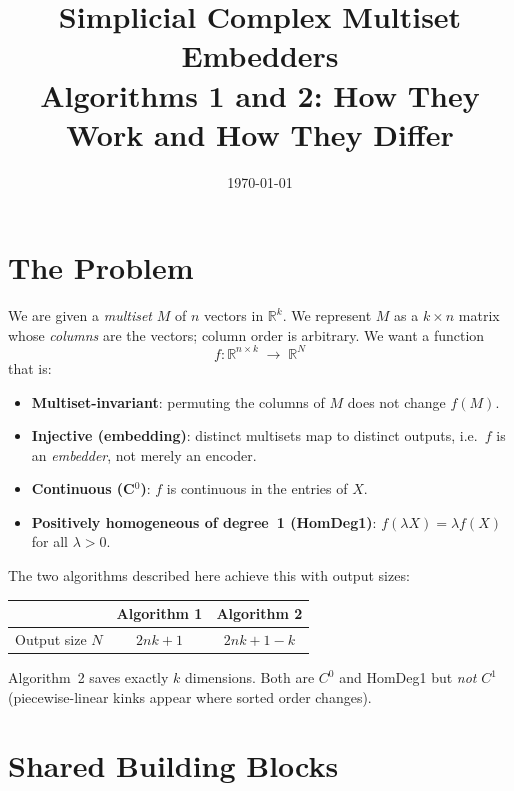 \documentclass[11pt,a4paper]{article}
\title{\textbf{Simplicial Complex Multiset Embedders}\\[0.4em]
       \large Algorithms 1 and 2: How They Work and How They Differ}
\date{\today}
\newcommand{\R}{\mathbb{R}}
\begin{document}
\maketitle
\tableofcontents
\vspace{1em}

\section{The Problem}

We are given a \emph{multiset} $M$ of $n$ vectors in $\R^k$.
We represent $M$ as a $k{\times}n$ matrix whose \emph{columns} are the vectors;
column order is arbitrary.  We want a function
\[
  f: \R^{n \times k} \;\longrightarrow\; \R^N
\]
that is:
\begin{itemize}[nosep]
  \item \textbf{Multiset-invariant}: permuting the columns of $M$ does not change $f(M)$.
  \item \textbf{Injective (embedding)}: distinct multisets map to distinct outputs,
        i.e.\ $f$ is an \emph{embedder}, not merely an encoder.
  \item \textbf{Continuous (C$^0$)}: $f$ is continuous in the entries of $X$.
  \item \textbf{Positively homogeneous of degree~1 (HomDeg1)}: $f(\lambda X) = \lambda f(X)$
        for all $\lambda > 0$.
\end{itemize}

The two algorithms described here achieve this with output sizes:
\begin{center}
\renewcommand{\arraystretch}{1.3}
\begin{tabular}{lcc}
  \toprule
  & \textbf{Algorithm 1} & \textbf{Algorithm 2} \\
  \midrule
  Output size $N$ & $2nk + 1$ & $2nk + 1 - k$ \\
  \bottomrule
\end{tabular}
\end{center}
Algorithm~2 saves exactly $k$ dimensions.  Both are $C^0$ and HomDeg1 but \emph{not}
$C^1$ (piecewise-linear kinks appear where sorted order changes).


\section{Shared Building Blocks}
\label{sec:building-blocks}
\end{document}
